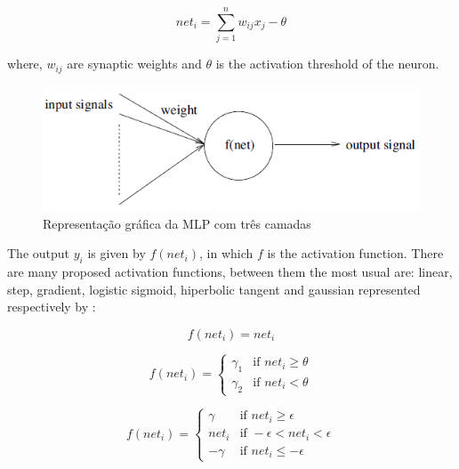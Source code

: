 \begin{equation}
\label{eq:net}
net_i = \sum_{j=1}^{n} w_{ij}x_j - \theta
\end{equation}

where, $w_{ij}$ are synaptic weights and $\theta$ is the activation threshold of the neuron.

\begin{figure}[h]
	\centering
	\includegraphics[width=.6\textwidth]{image/neuronio.png}
	\caption{Representação gráfica da MLP com três camadas}
	\label{fig:neuronio}
\end{figure}

The output $y_i$ is given by $f(net_i)$, in which $f$ is the activation function. There are many proposed activation functions, between them the most usual are: linear, step, gradient, logistic sigmoid, hiperbolic tangent and gaussian represented respectively by \cite{valenca2005aplicando} \cite{engelbrecht2007computational}:

\begin{equation}
\label{eq:linear_activation}
f(net_i) = net_i
\end{equation}

\begin{equation}
\label{eq:step_activation}
f(net_i) = 
\begin{cases}
    \gamma_1 & \text{if } net_i \geq \theta \\
    \gamma_2 & \text{if } net_i < \theta
\end{cases}
\end{equation}

\begin{equation}
\label{eq:ramp_activation}
f(net_i) = 
\begin{cases}
    \gamma & \text{if } net_i \geq \epsilon \\
    net_i & \text{if } -\epsilon < net_i < \epsilon \\
    -\gamma & \text{if } net_i \leq -\epsilon
\end{cases}
\end{equation}

